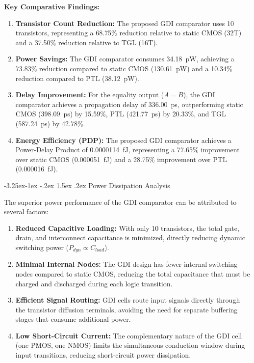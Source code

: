 \documentclass[12pt,a4paper,oneside]{report}
\makeatletter
\renewcommand\subsection{\@startsection{subsection}{2}{\z@}%
                                     {-3.25ex\@plus -1ex \@minus -.2ex}%
                                     {1.5ex \@plus .2ex}%
                                     {\normalfont\normalsize\bfseries\itshape}}
\makeatother
\begin{document}
\noindent\textbf{Key Comparative Findings:}
\begin{enumerate}
\item \textbf{Transistor Count Reduction:} The proposed GDI comparator uses 10 transistors, representing a 68.75\% reduction relative to static CMOS (32T) and a 37.50\% reduction relative to TGL (16T).
\item \textbf{Power Savings:} The GDI comparator consumes 34.18~pW, achieving a 73.83\% reduction compared to static CMOS (130.61~pW) and a 10.34\% reduction compared to PTL (38.12~pW).
\item \textbf{Delay Improvement:} For the equality output ($A=B$), the GDI comparator achieves a propagation delay of 336.00~ps, outperforming static CMOS (398.09~ps) by 15.59\%, PTL (421.77~ps) by 20.33\%, and TGL (587.24~ps) by 42.78\%.
\item \textbf{Energy Efficiency (PDP):} The proposed GDI comparator achieves a Power-Delay Product of 0.0000114~fJ, representing a 77.65\% improvement over static CMOS (0.000051~fJ) and a 28.75\% improvement over PTL (0.000016~fJ).
\end{enumerate}

\subsection{Power Dissipation Analysis}

The superior power performance of the GDI comparator can be attributed to several factors:
\begin{enumerate}
\item \textbf{Reduced Capacitive Loading:} With only 10 transistors, the total gate, drain, and interconnect capacitance is minimized, directly reducing dynamic switching power ($P_{dyn} \propto C_{load}$).
\item \textbf{Minimal Internal Nodes:} The GDI design has fewer internal switching nodes compared to static CMOS, reducing the total capacitance that must be charged and discharged during each logic transition.
\item \textbf{Efficient Signal Routing:} GDI cells route input signals directly through the transistor diffusion terminals, avoiding the need for separate buffering stages that consume additional power.
\item \textbf{Low Short-Circuit Current:} The complementary nature of the GDI cell (one PMOS, one NMOS) limits the simultaneous conduction window during input transitions, reducing short-circuit power dissipation.
\end{enumerate}
\end{document}

